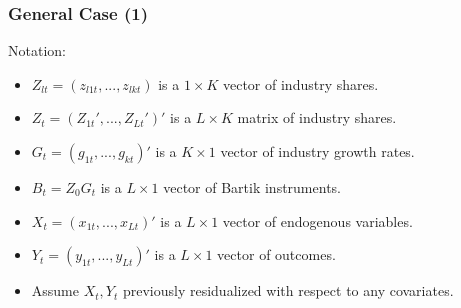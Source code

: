 \documentclass[english,xcolor=svgnames]{beamer}
\begin{document}
\begin{frame}
\frametitle[alignment=center]{General Case (1)}
Notation:
\begin{itemize}
	\item $Z_{lt}=(z_{l1t},...,z_{lkt})$ is a $1\times K$ vector of industry  shares.
	\item $Z_t = (Z_{1t}',...,Z_{Lt}')'$ is a $L\times K$ matrix of industry shares.
	\item $G_{t}=(g_{1t},...,g_{kt})'$ is a $K\times 1$ vector of industry growth rates.
	\item $B_t = Z_0 G_t$ is a $L\times 1$ vector of Bartik instruments.
	\item $X_t=(x_{1t},...,x_{Lt})'$ is a $L\times 1$ vector of endogenous variables.
	\item $Y_t=(y_{1t},...,y_{Lt})'$ is a $L\times 1$ vector of outcomes.
	\item Assume $X_t,Y_t$ previously residualized with respect to any covariates.
\end{itemize}
\end{frame}
\end{document}
